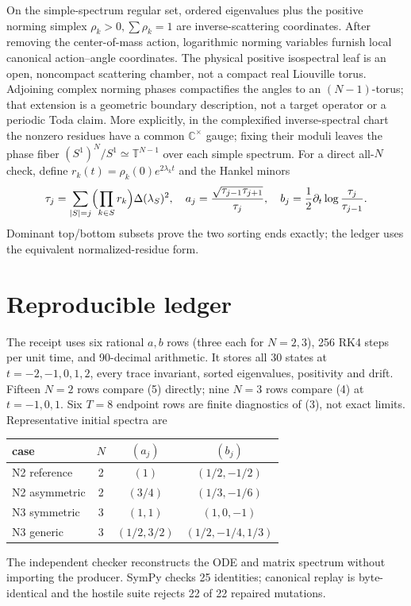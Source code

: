 \documentclass[10pt]{article}
\begin{document}
On the simple-spectrum regular set, ordered eigenvalues plus the positive
norming simplex \(\rho_k>0,\sum\rho_k=1\) are inverse-scattering coordinates.
After removing the center-of-mass action, logarithmic norming variables furnish
local canonical action--angle coordinates. The physical positive isospectral
leaf is an open, noncompact scattering chamber, not a compact real Liouville
torus. Adjoining complex norming phases compactifies the angles to an
\((N-1)\)-torus; that extension is a geometric boundary description, not a
target operator or a periodic Toda claim.
More explicitly, in the complexified inverse-spectral chart the nonzero
residues have a common \(\mathbb C^\times\) gauge; fixing their moduli leaves
the phase fiber \((S^1)^N/S^1\simeq\mathbb T^{N-1}\) over each simple spectrum.
For a direct all-\(N\) check, define \(r_k(t)=\rho_k(0)e^{2\lambda_k t}\) and
the Hankel minors
\[
 \tau_j=\sum_{|S|=j}\Bigl(\prod_{k\in S}r_k\Bigr)\Delta(\lambda_S)^2,\quad
 a_j=\frac{\sqrt{\tau_{j-1}\tau_{j+1}}}{\tau_j},\quad
 b_j=\frac12\partial_t\log\frac{\tau_j}{\tau_{j-1}}.
\]
Dominant top/bottom subsets prove the two sorting ends exactly; the ledger
uses the equivalent normalized-residue form.
\fi

\section{Reproducible ledger}
The receipt uses six rational \(a,b\) rows (three each for \(N=2,3\)), 256 RK4
steps per unit time, and 90-decimal arithmetic. It stores all 30 states at
\(t=-2,-1,0,1,2\), every trace invariant, sorted eigenvalues, positivity and
drift. Fifteen \(N=2\) rows compare (5) directly; nine \(N=3\) rows compare
(4) at \(t=-1,0,1\). Six \(T=8\) endpoint rows are finite diagnostics of (3),
not exact limits. Representative initial spectra are
\begin{center}
\small
\begin{tabular}{@{}lccc@{}}
\toprule
case & $N$ & $(a_j)$ & $(b_j)$\\
\midrule
N2 reference &2& $(1)$ & $(1/2,-1/2)$\\
N2 asymmetric &2& $(3/4)$ & $(1/3,-1/6)$\\
N3 symmetric &3& $(1,1)$ & $(1,0,-1)$\\
N3 generic &3& $(1/2,3/2)$ & $(1/2,-1/4,1/3)$\\
\bottomrule
\end{tabular}
\end{center}
The independent checker reconstructs the ODE and matrix spectrum without
importing the producer. SymPy checks 25 identities; canonical replay is
byte-identical and the hostile suite rejects 22 of 22 repaired mutations.
\end{document}
